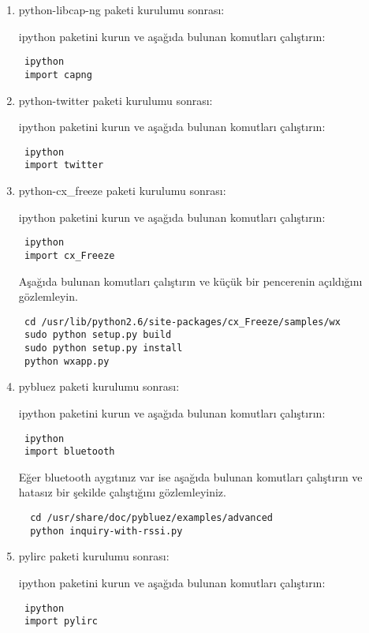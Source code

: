 \documentclass[a4paper,10pt]{article}
\begin{document}
\begin{enumerate}
\item python-libcap-ng  paketi kurulumu sonrası:

ipython paketini kurun ve aşağıda bulunan komutları çalıştırın:
\begin{verbatim}
 ipython
 import capng
\end{verbatim}

\item python-twitter paketi kurulumu sonrası:

ipython paketini kurun ve aşağıda bulunan komutları çalıştırın:
\begin{verbatim}
 ipython
 import twitter
\end{verbatim}


\item python-cx\_freeze paketi kurulumu sonrası:

ipython paketini kurun ve aşağıda bulunan komutları çalıştırın:
\begin{verbatim}
 ipython
 import cx_Freeze
\end{verbatim}

Aşağıda bulunan komutları çalıştırın ve küçük bir pencerenin açıldığını gözlemleyin.
\begin{verbatim}
 cd /usr/lib/python2.6/site-packages/cx_Freeze/samples/wx
 sudo python setup.py build
 sudo python setup.py install
 python wxapp.py
\end{verbatim}


\item pybluez paketi kurulumu sonrası:

ipython paketini kurun ve aşağıda bulunan komutları çalıştırın:
\begin{verbatim}
 ipython
 import bluetooth
\end{verbatim}

Eğer bluetooth aygıtınız var ise aşağıda bulunan komutları çalıştırın ve hatasız bir şekilde çalıştığını gözlemleyiniz.
\begin{verbatim}
  cd /usr/share/doc/pybluez/examples/advanced
  python inquiry-with-rssi.py
\end{verbatim}



\item pylirc paketi kurulumu sonrası:

ipython paketini kurun ve aşağıda bulunan komutları çalıştırın:
\begin{verbatim}
 ipython
 import pylirc
\end{verbatim}


\end{enumerate}
\end{document}
